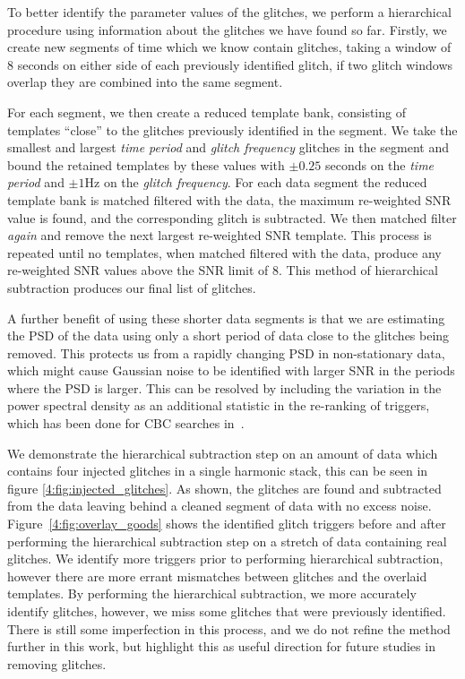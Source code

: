 To better identify the parameter values of the \scladj glitches, we perform a hierarchical procedure using information about the glitches we have found so far. Firstly, we create new segments of time which we know contain \scladj glitches, taking a window of $8$ seconds on either side of each previously identified glitch, if two glitch windows overlap they are combined into the same segment.

For each segment, we then create a reduced template bank, consisting of templates ``close'' to the \scladj glitches previously identified in the segment. We take the smallest and largest \emph{time period} and \emph{glitch frequency} glitches in the segment and bound the retained templates by these values with $\pm 0.25$ seconds on the \emph{time period} and $\pm 1$Hz on the \emph{glitch frequency}. For each data segment the reduced template bank is matched filtered with the data, the maximum re-weighted SNR value is found, and the corresponding glitch is subtracted. We then matched filter \emph{again} and remove the next largest re-weighted SNR template. This process is repeated until no templates, when matched filtered with the data, produce any re-weighted SNR values above the SNR limit of $8$. This method of hierarchical subtraction produces our final list of \scladj glitches.

A further benefit of using these shorter data segments is that we are estimating the PSD of the data using only a short period of data close to the \scladj glitches being removed. This protects us from a rapidly changing PSD in non-stationary data, which might cause Gaussian noise to be identified with larger SNR in the periods where the PSD is larger. This can be resolved by including the variation in the power spectral density as an additional statistic in the re-ranking of triggers, which has been done for CBC \gwadj searches in~\cite{PSD_var:2020}.

We demonstrate the hierarchical subtraction step on an amount of data which contains four injected \scladj glitches in a single harmonic stack, this can be seen in figure \ref{4:fig:injected_glitches}. As shown, the \scladj glitches are found and subtracted from the data leaving behind a cleaned segment of \gwadj data with no excess noise. Figure~\ref{4:fig:overlay_goods} shows the identified \scladj glitch triggers before and after performing the hierarchical subtraction step on a stretch of data containing real \scladj glitches. We identify more triggers prior to performing hierarchical subtraction, however there are more errant mismatches between \scladj glitches and the overlaid templates. By performing the hierarchical subtraction, we more accurately identify \scladj glitches, however, we miss some glitches that were previously identified. There is still some imperfection in this process, and we do not refine the method further in this work, but highlight this as useful direction for future studies in removing \scladj glitches. 

